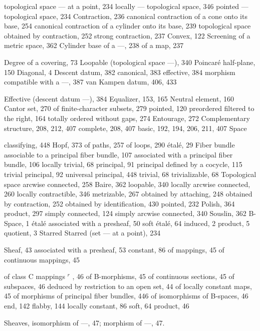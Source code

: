 topological space --- at a point, 234 locally --- topological space, 346 pointed --- topological space, 234 Contraction, 236 canonical contraction of a cone onto its base, 254 canonical contraction of a cylinder onto its base, 239 topological space obtained by contraction, 252 strong contraction, 237 Convex, 122 Screening of a metric space, 362 Cylinder base of a ---, 238 of a map, 237


Degree of a covering, 73 Loopable (topological space ---), 340 Poincaré half-plane, 150 Diagonal, 4 Descent datum, 382 canonical, 383 effective, 384 morphism compatible with a ---, 387 van Kampen datum, 406, 433


Effective (descent datum ---), 384 Equalizer, 153, 165 Neutral element, 160 Cantor set, 270 of finite-character subsets, 279 pointed, 120 preordered filtered to the right, 164 totally ordered without gaps, 274 Entourage, 272 Complementary structure, 208, 212, 407 complete, 208, 407 basic, 192, 194, 206, 211, 407 Space

classifying, 448 Hopf, 373 of paths, 257 of loops, 290 étalé, 29 Fiber bundle associable to a principal fiber bundle, 107 associated with a principal fiber bundle, 106 locally trivial, 68 principal, 91 principal defined by a cocycle, 115 trivial principal, 92 universal principal, 448 trivial, 68 trivializable, 68 Topological space arcwise connected, 258 Baire, 362 loopable, 340 locally arcwise connected, 260 locally contractible, 346 metrizable, 267 obtained by attaching, 248 obtained by contraction, 252 obtained by identification, 430 pointed, 232 Polish, 364 product, 297 simply connected, 124 simply arcwise connected, 340 Souslin, 362 B-Space, 1 étalé associated with a presheaf, 50 soft étalé, 64 induced, 2 product, 5 quotient, 3 Starred Starred (set --- at a point), 234


Sheaf, 43 associated with a presheaf, 53 constant, 86 of mappings, 45 of continuous mappings, 45

of class C mappings \(^{r}\) , 46 of B-morphisms, 45 of continuous sections, 45 of subspaces, 46 deduced by restriction to an open set, 44 of locally constant maps, 45 of morphisms of principal fiber bundles, 446 of isomorphisms of B-spaces, 46 end, 142 flabby, 144 locally constant, 86 soft, 64 product, 46

Sheaves, isomorphism of ---, 47; morphism of ---, 47.

